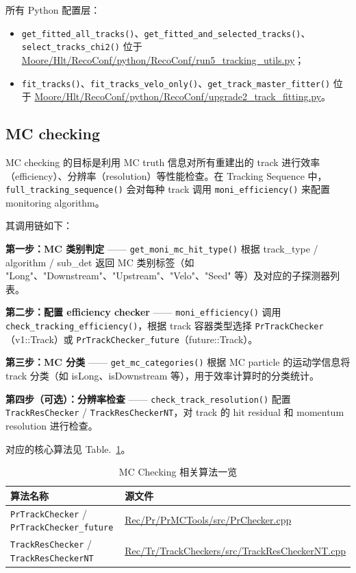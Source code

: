 \documentclass[UTF8]{article}
\begin{document}
所有 Python 配置层：
\begin{itemize}
  \item \lstinline{get_fitted_all_tracks()}、\lstinline{get_fitted_and_selected_tracks()}、\lstinline{select_tracks_chi2()} 位于 \url{Moore/Hlt/RecoConf/python/RecoConf/run5_tracking_utils.py}；
  \item \lstinline{fit_tracks()}、\lstinline{fit_tracks_velo_only()}、\lstinline{get_track_master_fitter()} 位于 \url{Moore/Hlt/RecoConf/python/RecoConf/upgrade2_track_fitting.py}。
\end{itemize}

\subsection{MC checking}

MC checking 的目标是利用 MC truth 信息对所有重建出的 track 进行效率（efficiency）、分辨率（resolution）等性能检查。在 Tracking Sequence 中，\lstinline{full_tracking_sequence()} 会对每种 track 调用 \lstinline{moni_efficiency()} 来配置 monitoring algorithm。

其调用链如下：

\textbf{第一步：MC 类别判定} —— \lstinline{get_moni_mc_hit_type()} 根据 track\_type / algorithm / sub\_det 返回 MC 类别标签（如 "Long"、"Downstream"、"Upstream"、"Velo"、"Seed" 等）及对应的子探测器列表。

\textbf{第二步：配置 efficiency checker} —— \lstinline{moni_efficiency()} 调用 \lstinline{check_tracking_efficiency()}，根据 track 容器类型选择 \texttt{PrTrackChecker}（v1::Track）或 \texttt{PrTrackChecker\_future}（future::Track）。

\textbf{第三步：MC 分类} —— \lstinline{get_mc_categories()} 根据 MC particle 的运动学信息将 track 分类（如 isLong、isDownstream 等），用于效率计算时的分类统计。

\textbf{第四步（可选）：分辨率检查} —— \lstinline{check_track_resolution()} 配置 \texttt{TrackResChecker} / \texttt{TrackResCheckerNT}，对 track 的 hit residual 和 momentum resolution 进行检查。

对应的核心算法见 Table.~\ref{tab:mc-algos}。

\begin{table}[htbp]
  \centering
  \caption{MC Checking 相关算法一览}
  \label{tab:mc-algos}
  \begin{tabular}{ll}
    \toprule
    算法名称 & 源文件 \\
    \midrule
    \texttt{PrTrackChecker} / \texttt{PrTrackChecker\_future} & \url{Rec/Pr/PrMCTools/src/PrChecker.cpp} \\
    \texttt{TrackResChecker} / \texttt{TrackResCheckerNT} & \url{Rec/Tr/TrackCheckers/src/TrackResCheckerNT.cpp} \\
    \bottomrule
  \end{tabular}
\end{table}
\end{document}
